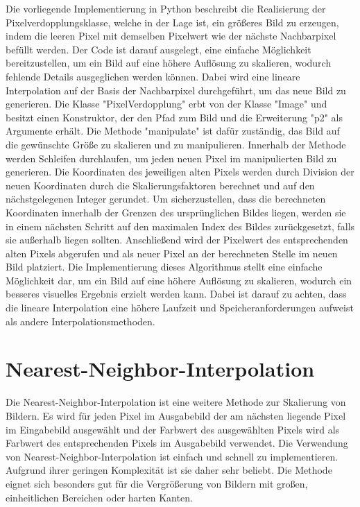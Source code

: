         Die vorliegende Implementierung in Python beschreibt die Realisierung der Pixelverdopplungsklasse, welche in der Lage ist, ein größeres Bild zu erzeugen, indem die leeren Pixel mit demselben Pixelwert wie der nächste Nachbarpixel befüllt werden.
        Der Code ist darauf ausgelegt, eine einfache Möglichkeit bereitzustellen, um ein Bild auf eine höhere Auflösung zu skalieren, wodurch fehlende Details ausgeglichen werden können. Dabei wird eine lineare Interpolation auf der Basis der Nachbarpixel durchgeführt, um das neue Bild zu generieren.
        Die Klasse "PixelVerdopplung" erbt von der Klasse "Image" und besitzt einen Konstruktor, der den Pfad zum Bild und die Erweiterung "p2" als Argumente erhält. 
        Die Methode "manipulate" ist dafür zuständig, das Bild auf die gewünschte Größe zu skalieren und zu manipulieren.
        Innerhalb der Methode werden Schleifen durchlaufen, um jeden neuen Pixel im manipulierten Bild zu generieren. 
        Die Koordinaten des jeweiligen alten Pixels werden durch Division der neuen Koordinaten durch die Skalierungsfaktoren berechnet und auf den nächstgelegenen Integer gerundet.
        Um sicherzustellen, dass die berechneten Koordinaten innerhalb der Grenzen des ursprünglichen Bildes liegen, werden sie in einem nächsten Schritt auf den maximalen Index des Bildes zurückgesetzt, falls sie außerhalb liegen sollten. 
        Anschließend wird der Pixelwert des entsprechenden alten Pixels abgerufen und als neuer Pixel an der berechneten Stelle im neuen Bild platziert.
        Die Implementierung dieses Algorithmus stellt eine einfache Möglichkeit dar, um ein Bild auf eine höhere Auflösung zu skalieren, wodurch ein besseres visuelles Ergebnis erzielt werden kann. 
        Dabei ist darauf zu achten, dass die lineare Interpolation eine höhere Laufzeit und Speicheranforderungen aufweist als andere Interpolationsmethoden.
        
    \section{Nearest-Neighbor-Interpolation}
        Die Nearest-Neighbor-Interpolation ist eine weitere Methode zur Skalierung von Bildern. 
        Es wird für jeden Pixel im Ausgabebild der am nächsten liegende Pixel im Eingabebild ausgewählt und der Farbwert des ausgewählten Pixels wird als Farbwert des entsprechenden Pixels im Ausgabebild verwendet.
        Die Verwendung von Nearest-Neighbor-Interpolation ist einfach und schnell zu implementieren. 
        Aufgrund ihrer geringen Komplexität ist sie daher sehr beliebt. 
        Die Methode eignet sich besonders gut für die Vergrößerung von Bildern mit großen, einheitlichen Bereichen oder harten Kanten. 
        
